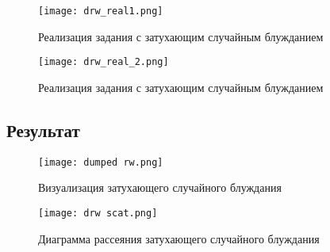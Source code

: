 \begin{figure}[H]
    \centering
    \texttt{[image: drw\_real1.png]}
    \caption{Реализация задания с затухающим случайным блужданием}
\end{figure}

\begin{figure}[H]
    \centering
    \texttt{[image: drw\_real\_2.png]}
    \caption{Реализация задания с затухающим случайным блужданием}
\end{figure}

\subsection*{Результат}

\begin{figure}[H]
    \centering
    \texttt{[image: dumped rw.png]}
    \caption{Визуализация затухающего случайного блуждания}
\end{figure}

\begin{figure}[H]
    \centering
    \texttt{[image: drw scat.png]}
    \caption{Диаграмма рассеяния затухающего случайного блуждания}
\end{figure}

\endinput